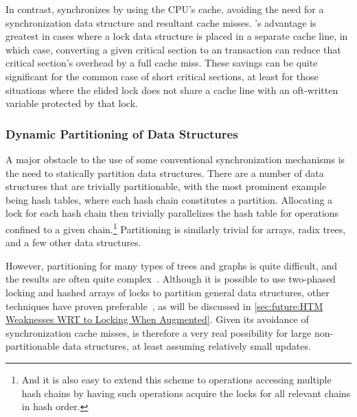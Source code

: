 In contrast,  synchronizes by using the CPU's cache, avoiding the need
for a synchronization data structure and resultant cache misses.
's advantage is greatest in cases where a lock data structure is
placed in a separate cache line, in which case, converting a given
critical section to an  transaction can reduce that critical section's
overhead by a full cache miss.
These savings can be quite significant for the common case of short
critical sections, at least for those situations where the elided lock
does not share a cache line with an oft-written variable protected by
that lock.

\QuickQuizEnd

\subsubsection{Dynamic Partitioning of Data Structures}
\label{sec:future:Dynamic Partitioning of Data Structures}

A major obstacle to the use of some conventional synchronization mechanisms
is the need to statically partition data structures.
There are a number of data structures that are trivially
partitionable, with the most prominent example being hash tables,
where each hash chain constitutes a partition.
Allocating a lock for each hash chain then trivially parallelizes
the hash table for operations confined to a given chain.\footnote{
	And it is also easy to extend this scheme to operations accessing
	multiple hash chains by having such operations acquire the
	locks for all relevant chains in hash order.}
Partitioning is similarly trivial for arrays, radix trees, and a few
other data structures.

However, partitioning for many types of trees and graphs is quite
difficult, and the results are often quite complex~\cite{Ellis80}.
Although it is possible to use two-phased locking and hashed arrays
of locks to partition general data structures, other techniques
have proven preferable~\cite{DavidSMiller2006HashedLocking},
as will be discussed in
\cref{sec:future:HTM Weaknesses WRT to Locking When Augmented}.
Given its avoidance of synchronization cache misses,
 is therefore a very real possibility for large non-partitionable
data structures, at least assuming relatively small updates.

